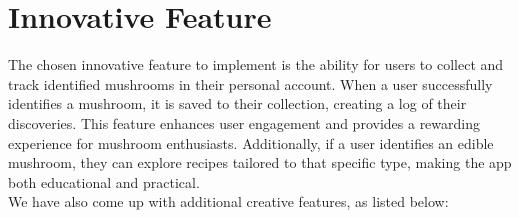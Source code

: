 \documentclass{article}
\begin{document}
\begingroup
\color{red}

\section{Innovative Feature}

The chosen innovative feature to implement is the ability for users to collect and track identified mushrooms in their personal account. When a user successfully identifies a mushroom, it is saved to their collection, creating a log of their discoveries. This feature enhances user engagement and provides a rewarding experience for mushroom enthusiasts. Additionally, if a user identifies an edible mushroom, they can explore recipes tailored to that specific type, making the app both educational and practical.\\
We have also come up with additional creative features, as listed below:
\end{document}
